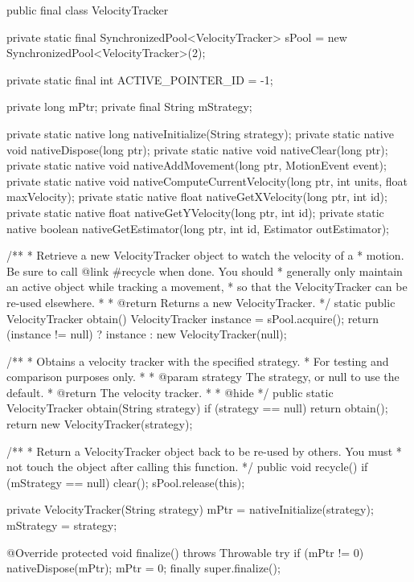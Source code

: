 public final class VelocityTracker {
    private static final SynchronizedPool<VelocityTracker> sPool =
            new SynchronizedPool<VelocityTracker>(2);

    private static final int ACTIVE_POINTER_ID = -1;

    private long mPtr;
    private final String mStrategy;

    private static native long nativeInitialize(String strategy);
    private static native void nativeDispose(long ptr);
    private static native void nativeClear(long ptr);
    private static native void nativeAddMovement(long ptr, MotionEvent event);
    private static native void nativeComputeCurrentVelocity(long ptr, int units, float maxVelocity);
    private static native float nativeGetXVelocity(long ptr, int id);
    private static native float nativeGetYVelocity(long ptr, int id);
    private static native boolean nativeGetEstimator(long ptr, int id, Estimator outEstimator);

    /**
     * Retrieve a new VelocityTracker object to watch the velocity of a
     * motion.  Be sure to call {@link #recycle} when done.  You should
     * generally only maintain an active object while tracking a movement,
     * so that the VelocityTracker can be re-used elsewhere.
     *
     * @return Returns a new VelocityTracker.
     */
    static public VelocityTracker obtain() {
        VelocityTracker instance = sPool.acquire();
        return (instance != null) ? instance : new VelocityTracker(null);
    }

    /**
     * Obtains a velocity tracker with the specified strategy.
     * For testing and comparison purposes only.
     *
     * @param strategy The strategy, or null to use the default.
     * @return The velocity tracker.
     *
     * @hide
     */
    public static VelocityTracker obtain(String strategy) {
        if (strategy == null) {
            return obtain();
        }
        return new VelocityTracker(strategy);
    }

    /**
     * Return a VelocityTracker object back to be re-used by others.  You must
     * not touch the object after calling this function.
     */
    public void recycle() {
        if (mStrategy == null) {
            clear();
            sPool.release(this);
        }
    }

    private VelocityTracker(String strategy) {
        mPtr = nativeInitialize(strategy);
        mStrategy = strategy;
    }

    @Override
    protected void finalize() throws Throwable {
        try {
            if (mPtr != 0) {
                nativeDispose(mPtr);
                mPtr = 0;
            }
        } finally {
            super.finalize();
        }
    }

}
